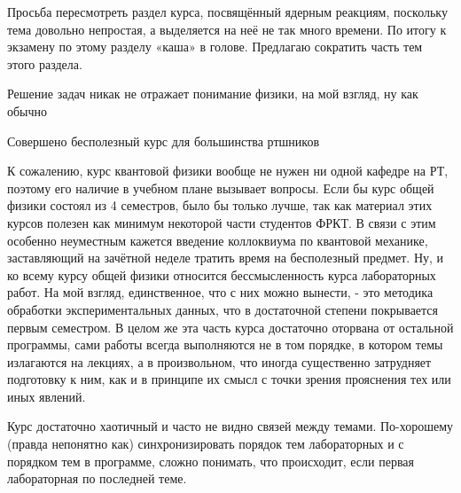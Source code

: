             \begin{commentbox}
                Просьба пересмотреть раздел курса, посвящённый ядерным реакциям, поскольку тема довольно непростая, а выделяется на неё не так много времени. По итогу к экзамену по этому разделу «каша» в голове. Предлагаю сократить часть тем этого раздела.
            \end{commentbox}

            \begin{commentbox}
                Решение задач никак не отражает понимание физики, на мой взгляд, ну как обычно
            \end{commentbox}

            \begin{commentbox}
                Совершено бесполезный курс для большинства ртшников
            \end{commentbox}

            \begin{commentbox}
                К сожалению, курс квантовой физики вообще не нужен ни одной кафедре на РТ, поэтому его наличие в учебном плане вызывает вопросы. Если бы курс общей физики состоял из 4 семестров, было бы только лучше, так как материал этих курсов полезен как минимум некоторой части студентов ФРКТ. В связи с этим особенно неуместным кажется введение коллоквиума по квантовой механике, заставляющий на зачётной неделе тратить время на бесполезный предмет. Ну, и ко всему курсу общей физики относится бессмысленность курса лабораторных работ. На мой взгляд, единственное, что с них можно вынести, - это методика обработки экспериментальных данных, что в достаточной степени покрывается первым семестром. В целом же эта часть курса достаточно оторвана от остальной программы, сами работы всегда выполняются не в том порядке, в котором темы излагаются на лекциях, а в произвольном, что иногда существенно затрудняет подготовку к ним, как и в принципе их смысл с точки зрения прояснения тех или иных явлений. 
            \end{commentbox}

            \begin{commentbox}
                Курс достаточно хаотичный и часто не видно связей между темами. По-хорошему (правда непонятно как) синхронизировать порядок тем лабораторных и с порядком тем в программе, сложно понимать, что происходит, если первая лабораторная по последней теме.
            \end{commentbox}